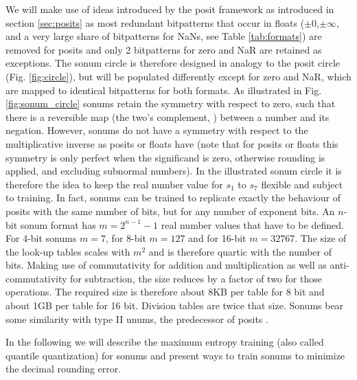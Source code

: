 We will make use of ideas introduced by the posit framework as introduced in section \ref{sec:posits} as most redundant bitpatterns that occur in floats ($\pm0$,$\pm\infty$, and a very large share of bitpatterns for NaNs, see Table \ref{tab:formats}) are removed for posits and only 2 bitpatterns for zero and NaR are retained as exceptions. The sonum circle is therefore designed in analogy to the posit circle (Fig. \ref{fig:circle}), but will be populated differently except for zero and NaR, which are mapped to identical bitpatterns for both formats. As illustrated in Fig. \ref{fig:sonum_circle} sonums retain the symmetry with respect to zero, such that there is a reversible map (the two's complement, \cite{Choo2003}) between a number and its negation. However, sonums do not have a symmetry with respect to the multiplicative inverse as posits or floats have (note that for posits or floats this symmetry is only perfect when the significand is zero, otherwise rounding is applied, and excluding subnormal numbers). In the illustrated sonum circle it is therefore the idea to keep the real number value for $s_1$ to $s_7$  flexible and subject to training.
In fact, sonums can be trained to replicate exactly the behaviour of posits with the same number of bits, but for any number of exponent bits. An $n$-bit sonum format has $m = 2^{n-1} - 1$ real number values that have to be defined. For 4-bit sonums $m=7$, for 8-bit $m=127$ and for 16-bit $m=32767$. The size of the look-up tables scales with $m^2$ and is therefore quartic with the number of bits. Making use of commutativity for addition and multiplication as well as anti-commutativity for subtraction, the size reduces by a factor of two for those operations. The required size is therefore about 8KB per table for 8 bit and about 1GB per table for 16 bit. Division tables are twice that size. Sonums bear some similarity with type II unums, the predecessor of posits \citep{Gustafson2017}.

In the following we will describe the maximum entropy training (also called quantile quantization) for sonums and present ways to train sonums to minimize the decimal rounding error.


